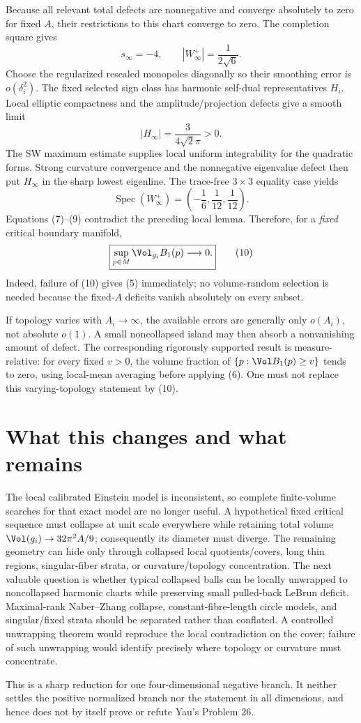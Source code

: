 Because all relevant total defects are nonnegative and converge absolutely to
zero for fixed $A$, their restrictions to this chart converge to zero.  The
completion square gives
\[
 s_\infty=-4,
 \qquad |W_\infty^+|=\frac1{2\sqrt6}.                    \tag{7}
\]
Choose the regularized rescaled monopoles diagonally so their smoothing error
is $o(\delta_i^2)$.  The fixed selected sign class has harmonic self-dual
representatives $H_i$.  Local elliptic compactness and the amplitude/projection
defects give a smooth limit
\[
 |H_\infty|=\frac{3}{4\sqrt2\pi}>0.                      \tag{8}
\]
The SW maximum estimate supplies local uniform integrability for the quadratic
forms.  Strong curvature convergence and the nonnegative eigenvalue defect then
put $H_\infty$ in the sharp lowest eigenline.  The trace-free $3\times3$
equality case yields
\[
 \operatorname{Spec}(W_\infty^+)
 =\left(-\frac16,\frac1{12},\frac1{12}\right).           \tag{9}
\]
Equations (7)--(9) contradict the preceding local lemma.  Therefore, for a
\emph{fixed} critical boundary manifold,
\[
 \boxed{\sup_{p\in M}\Vol_{g_i}B_1(p)\longrightarrow0.}  \tag{10}
\]
Indeed, failure of (10) gives (5) immediately; no volume-random selection is
needed because the fixed-$A$ deficits vanish absolutely on every subset.

If topology varies with $A_i\to\infty$, the available errors are generally only
$o(A_i)$, not absolute $o(1)$.  A small noncollapsed island may then absorb a
nonvanishing amount of defect.  The corresponding rigorously supported result
is measure-relative: for every fixed $v>0$, the volume fraction of
$\{p:\Vol B_1(p)\ge v\}$ tends to zero, using local-mean averaging before
applying (6).  One must not replace this varying-topology statement by (10).

\section{What this changes and what remains}
The local calibrated Einstein model is inconsistent, so complete finite-volume
searches for that exact model are no longer useful.  A hypothetical fixed
critical sequence must collapse at unit scale everywhere while retaining total
volume $\Vol(g_i)\to32\pi^2A/9$; consequently its diameter must diverge.  The
remaining geometry can hide only through collapsed local quotients/covers,
long thin regions, singular-fiber strata, or curvature/topology concentration.
The next valuable question is whether typical collapsed balls can be locally
unwrapped to noncollapsed harmonic charts while preserving small pulled-back
LeBrun deficit.  Maximal-rank Naber--Zhang collapse, constant-fibre-length
circle models, and singular/fixed strata should be separated rather than
conflated.  A controlled unwrapping theorem would reproduce the local
contradiction on the cover; failure of such unwrapping would identify precisely
where topology or curvature must concentrate.

This is a sharp reduction for one four-dimensional negative branch.  It neither
settles the positive normalized branch nor the statement in all dimensions,
and hence does not by itself prove or refute Yau's Problem 26.
